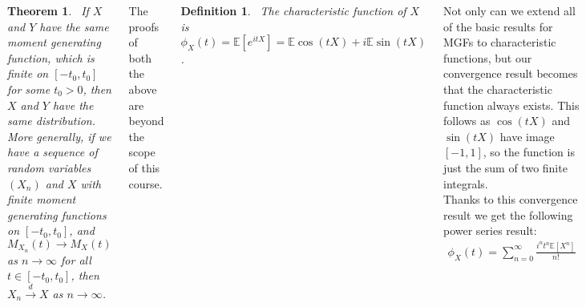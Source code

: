 \documentclass{tikzposter} %
\newtheorem{theorem}{Theorem}
\newtheorem{definition}{Definition}
\begin{document}
\begin{columns}
{  \begin{theorem}
    \ If $X$ and $Y$ have the same moment generating function, which is finite on $[-t_{0}, t_{0}]$ for some $t_{0} > 0$, then $X$ and $Y$ have the same distribution. \\

    More generally, if we have a sequence of random variables $(X_{n})$ and $X$ with finite moment generating functions on $[-t_{0}, t_{0}]$, and $M_{X_{n}}(t) \to M_{X}(t)$ as $n \to \infty$ for all $t \in [-t_{0}, t_{0}]$, then $X_{n} \overset{d}{\to} X$ as $n \to \infty$.
  \end{theorem}
  \hphantom{}

  The proofs of both the above are beyond the scope of this course. \\

  \begin{definition}
  \ The characteristic function of $X$ is $\phi_{X}(t) = \mathbb{E}[e^{itX}] = \mathbb{E} \cos(tX) + i\mathbb{E} \sin(tX)$.
  \end{definition}
  \hphantom{}

  Not only can we extend all of the basic results for MGFs to characteristic functions, but our convergence result becomes that the characteristic function always exists. This follows as $\cos (tX)$ and $\sin (tX)$ have image $[-1,1]$, so the function is just the sum of two finite integrals. \\

  Thanks to this convergence result we get the following power series result:
  \begin{align*}
    \phi_{X}(t) = \sum_{n=0}^{\infty} \frac{i^{n}t^{n}\mathbb{E}[X^{n}]}{n!}
  \end{align*}

  Both the uniqueness and continuity statements hold in a similar way as for MGFs, but as before their proofs are beyond the scope of this course. \\

  \textbf{TODO: Write down the generatinng and characteristic functions of all basic distributions}
}

\end{columns}
\end{document}
